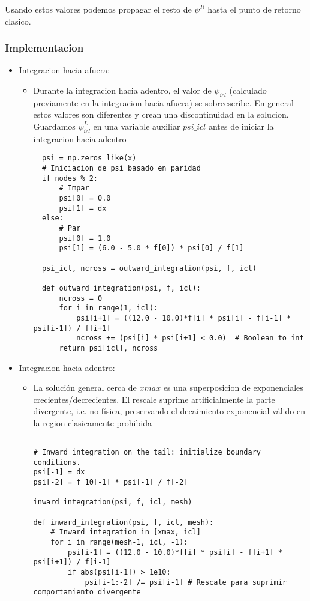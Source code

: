 \documentclass[11pt]{article}
\begin{document}
Usando estos valores podemos propagar el resto de \(\psi^R\) hasta el punto de retorno clasico.
\subsubsection{Implementacion}
\label{sec:orge9ccca9}

\begin{itemize}
\item Integracion hacia afuera:

\begin{itemize}
\item Durante la integracion hacia adentro, el valor de \(\psi_{icl}\) (calculado previamente en la integracion hacia afuera) se sobreescribe. En general estos valores son diferentes y crean una discontinuidad en la solucion. Guardamos \(\psi^L_{icl}\) en una variable auxiliar \(psi\_icl\) antes de iniciar la integracion hacia adentro

\begin{verbatim}
  psi = np.zeros_like(x)
  # Iniciacion de psi basado en paridad
  if nodes % 2:
      # Impar
      psi[0] = 0.0
      psi[1] = dx
  else:
      # Par
      psi[0] = 1.0
      psi[1] = (6.0 - 5.0 * f[0]) * psi[0] / f[1]

  psi_icl, ncross = outward_integration(psi, f, icl)

  def outward_integration(psi, f, icl):
      ncross = 0
      for i in range(1, icl):
          psi[i+1] = ((12.0 - 10.0)*f[i] * psi[i] - f[i-1] * psi[i-1]) / f[i+1]
          ncross += (psi[i] * psi[i+1] < 0.0)  # Boolean to int
      return psi[icl], ncross

\end{verbatim}
\end{itemize}

\item Integracion hacia adentro:

\begin{itemize}
\item La solución general cerca de \(xmax\) es una superposicion de exponenciales crecientes/decrecientes. El rescale suprime artificialmente la parte divergente, i.e. no física, preservando el decaimiento exponencial válido en la region clasicamente prohibida

\begin{verbatim}

# Inward integration on the tail: initialize boundary conditions.
psi[-1] = dx
psi[-2] = f_10[-1] * psi[-1] / f[-2]

inward_integration(psi, f, icl, mesh)

def inward_integration(psi, f, icl, mesh):
    # Inward integration in [xmax, icl]
    for i in range(mesh-1, icl, -1):
        psi[i-1] = ((12.0 - 10.0)*f[i] * psi[i] - f[i+1] * psi[i+1]) / f[i-1]
        if abs(psi[i-1]) > 1e10:
            psi[i-1:-2] /= psi[i-1] # Rescale para suprimir comportamiento divergente

\end{verbatim}
\end{itemize}
\end{itemize}
\end{document}
